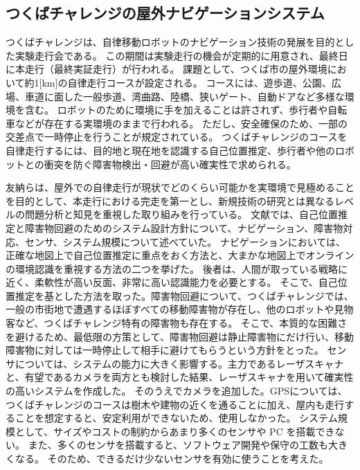 \subsection{つくばチャレンジの屋外ナビゲーションシステム}
つくばチャレンジ\cite{auto:tsukuba}は、自律移動ロボットのナビゲーション技術の発展を目的とした実験走行会である。
この期間は実験走行の機会が定期的に用意され、最終日に本走行（最終実証走行）が行われる。
課題として、つくば市の屋外環境において約1[km]の自律走行コースが設定される。
コースには、遊歩道、公園、広場、車道に面した一般歩道、湾曲路、陸橋、狭いゲート、自動ドアなど多様な環境を含む。
ロボットのために環境に手を加えることは許されず、歩行者や自転車などが存在する実環境のままで行われる。
ただし、安全確保のため、一部の交差点で一時停止を行うことが規定されている。
つくばチャレンジのコースを自律走行するには、目的地と現在地を認識する自己位置推定、歩行者や他のロボットとの衝突を防ぐ障害物検出・回避が高い確実性で求められる。

友納ら\cite{auto:tomonoh}は、屋外での自律走行が現状でどのくらい可能かを実環境で見極めることを目的として、本走行における完走を第一とし、新規技術の研究とは異なるレベルの問題分析と知見を重視した取り組みを行っている。
文献では、自己位置推定と障害物回避のためのシステム設計方針について、ナビゲーション、障害物対応、センサ、システム規模について述べていた。
ナビゲーションにおいては、正確な地図上で自己位置推定に重点をおく方法と、大まかな地図上でオンラインの環境認識を重視する方法の二つを挙げた。
後者は、人間が取っている戦略に近く、柔軟性が高い反面、非常に高い認識能力を必要とする。
そこで、自己位置推定を基とした方法を取った。障害物回避について、つくばチャレンジでは、一般の市街地で遭遇するほぼすべての移動障害物が存在し、他のロボットや見物客など、つくばチャレンジ特有の障害物も存在する。
そこで、本質的な困難さを避けるため、最低限の方策として、障害物回避は静止障害物にだけ行い、移動障害物に対しては一時停止して相手に避けてもらうという方針をとった。
センサについては、システムの能力に大きく影響する。主力であるレーザスキャナと、有望であるカメラを両方とも検討した結果、レーザスキャナを用いて確実性の高いシステムを作成した。
そのうえでカメラを追加した。GPSについては、つくばチャレンジのコースは樹木や建物の近くを通ることに加え、屋内も走行することを想定すると、安定利用ができないため、使用しなかった。
システム規模として、サイズやコストの制約からあまり多くのセンサや PC を搭載できない。
また、多くのセンサを搭載すると、ソフトウェア開発や保守の工数も大きくなる。
そのため、できるだけ少ないセンサを有効に使うことを考えた。

